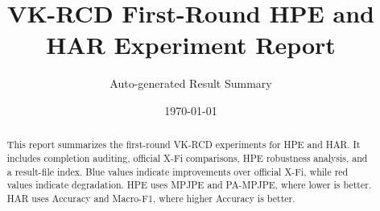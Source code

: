 \documentclass[10pt]{article}
\title{VK-RCD First-Round HPE and HAR Experiment Report}
\author{Auto-generated Result Summary}
\date{\today}
\begin{document}
\maketitle
\begin{abstract}
This report summarizes the first-round VK-RCD experiments for HPE and HAR. It includes completion auditing, official X-Fi comparisons, HPE robustness analysis, and a result-file index. Blue values indicate improvements over official X-Fi, while red values indicate degradation. HPE uses MPJPE and PA-MPJPE, where lower is better. HAR uses Accuracy and Macro-F1, where higher Accuracy is better.
\end{abstract}
\tableofcontents




\end{document}
